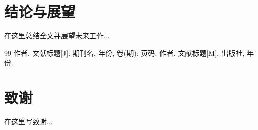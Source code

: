 \documentclass[12pt,a4paper]{article}
\begin{document}
\section{结论与展望}
在这里总结全文并展望未来工作...

\begin{thebibliography}{99}
 作者. 文献标题[J]. 期刊名, 年份, 卷(期): 页码.
 作者. 文献标题[M]. 出版社, 年份.
\end{thebibliography}

\section*{致谢}
在这里写致谢...
\end{document}
